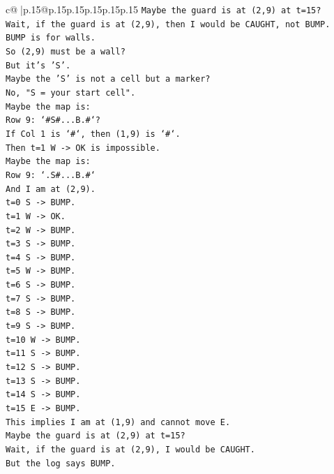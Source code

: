 \documentclass{article}
\begin{document}
{\begin{supertabular}{c@{$\;$}|p{.15\linewidth}@{}p{.15\linewidth}p{.15\linewidth}p{.15\linewidth}p{.15\linewidth}p{.15\linewidth}}
{{{\texttt{Maybe the guard is at (2,9) at t=15?} \\
\texttt{Wait, if the guard is at (2,9), then I would be CAUGHT, not BUMP.} \\
\texttt{BUMP is for walls.} \\
\texttt{So (2,9) must be a wall?} \\
\texttt{But it's 'S'.} \\
\texttt{Maybe the 'S' is not a cell but a marker?} \\
\texttt{No, "S = your start cell".} \\
\texttt{Maybe the map is:} \\
\texttt{Row 9: `\#S\#...B.\#`?} \\
\texttt{If Col 1 is `\#`, then (1,9) is `\#`.} \\
\texttt{Then t=1 W {-}> OK is impossible.} \\
\texttt{Maybe the map is:} \\
\texttt{Row 9: `.S\#...B.\#`} \\
\texttt{And I am at (2,9).} \\
\texttt{t=0 S {-}> BUMP.} \\
\texttt{t=1 W {-}> OK.} \\
\texttt{t=2 W {-}> BUMP.} \\
\texttt{t=3 S {-}> BUMP.} \\
\texttt{t=4 S {-}> BUMP.} \\
\texttt{t=5 W {-}> BUMP.} \\
\texttt{t=6 S {-}> BUMP.} \\
\texttt{t=7 S {-}> BUMP.} \\
\texttt{t=8 S {-}> BUMP.} \\
\texttt{t=9 S {-}> BUMP.} \\
\texttt{t=10 W {-}> BUMP.} \\
\texttt{t=11 S {-}> BUMP.} \\
\texttt{t=12 S {-}> BUMP.} \\
\texttt{t=13 S {-}> BUMP.} \\
\texttt{t=14 S {-}> BUMP.} \\
\texttt{t=15 E {-}> BUMP.} \\
\texttt{This implies I am at (1,9) and cannot move E.} \\
\texttt{Maybe the guard is at (2,9) at t=15?} \\
\texttt{Wait, if the guard is at (2,9), I would be CAUGHT.} \\
\texttt{But the log says BUMP.} \\
}}}
\end{supertabular}}
\end{document}
